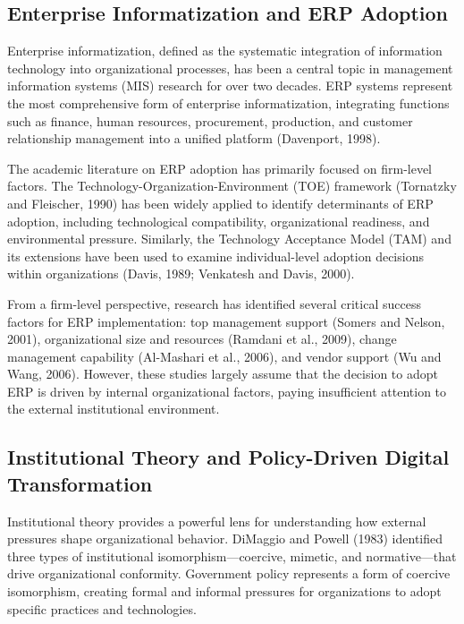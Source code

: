 \documentclass[12pt]{article}
\begin{document}
\subsection{Enterprise Informatization and ERP Adoption}

Enterprise informatization, defined as the systematic integration of information technology into organizational processes, has been a central topic in management information systems (MIS) research for over two decades. ERP systems represent the most comprehensive form of enterprise informatization, integrating functions such as finance, human resources, procurement, production, and customer relationship management into a unified platform (Davenport, 1998).

The academic literature on ERP adoption has primarily focused on firm-level factors. The Technology-Organization-Environment (TOE) framework (Tornatzky and Fleischer, 1990) has been widely applied to identify determinants of ERP adoption, including technological compatibility, organizational readiness, and environmental pressure. Similarly, the Technology Acceptance Model (TAM) and its extensions have been used to examine individual-level adoption decisions within organizations (Davis, 1989; Venkatesh and Davis, 2000).

From a firm-level perspective, research has identified several critical success factors for ERP implementation: top management support (Somers and Nelson, 2001), organizational size and resources (Ramdani et al., 2009), change management capability (Al-Mashari et al., 2006), and vendor support (Wu and Wang, 2006). However, these studies largely assume that the decision to adopt ERP is driven by internal organizational factors, paying insufficient attention to the external institutional environment.

\subsection{Institutional Theory and Policy-Driven Digital Transformation}

Institutional theory provides a powerful lens for understanding how external pressures shape organizational behavior. DiMaggio and Powell (1983) identified three types of institutional isomorphism—coercive, mimetic, and normative—that drive organizational conformity. Government policy represents a form of coercive isomorphism, creating formal and informal pressures for organizations to adopt specific practices and technologies.
\end{document}
